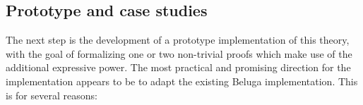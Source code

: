 \documentclass{article}
\newcommand{\LONGVERSION}[1]{{\color{light-gray}#1}}
\begin{document}









\subsection{Prototype and case studies}\label{sec:prototype}
The next step is the development of a prototype implementation of this
theory, with the goal of formalizing one or two non-trivial proofs
which make use of the additional expressive power. 
The most practical and promising direction for the implementation
appears to be to adapt the existing Beluga implementation. This is for
several reasons:
\end{document}
